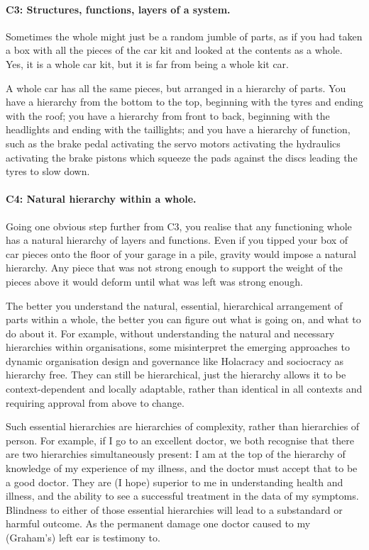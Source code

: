 \paragraph{\textbf{C3: Structures, functions, layers of a system.}}
Sometimes the whole might just be a random jumble of parts, as if you had taken a box with all the pieces of the car kit and looked at the contents as a whole. Yes, it is a whole car kit, but it is far from being a whole kit car.


A whole car has all the same pieces, but arranged in a hierarchy of parts. You have a hierarchy from the bottom to the top, beginning with the tyres and ending with the roof; you have a hierarchy from front to back, beginning with the headlights and ending with the taillights; and you have a hierarchy of function, such as the brake pedal activating the servo motors activating the hydraulics activating the brake pistons which squeeze the pads against the discs leading the tyres to slow down.


\paragraph{\textbf{C4: Natural hierarchy within a whole.}}
Going one obvious step further from C3, you realise that any functioning whole has a natural hierarchy of layers and functions. Even if you tipped your box of car pieces onto the floor of your garage in a pile, gravity would impose a natural hierarchy. Any piece that was not strong enough to support the weight of the pieces above it would deform until what was left was strong enough.


The better you understand the natural, essential, hierarchical arrangement of parts within a whole, the better you can figure out what is going on, and what to do about it. For example, without understanding the natural and necessary hierarchies within organisations, some misinterpret the emerging approaches to dynamic organisation design and governance like Holacracy  and sociocracy as hierarchy free. They can still be hierarchical, just the hierarchy allows it to be context-dependent and locally adaptable, rather than identical in all contexts and requiring approval from above to change. 


Such essential hierarchies are hierarchies of complexity, rather than hierarchies of person. For example, if I go to an excellent doctor, we both recognise that there are two hierarchies simultaneously present: I am at the top of the hierarchy of knowledge of my experience of my illness, and the doctor must accept that to be a good doctor. They are (I hope) superior to me in understanding health and illness, and the ability to see a successful treatment in the data of my symptoms. Blindness to either of those essential hierarchies will lead to a substandard or harmful outcome. As the permanent damage one doctor caused to my (Graham’s) left ear is testimony to.
